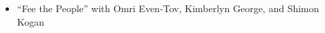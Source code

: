 
\vspace*{-.1in}

\begin{itemize}
\vspace*{-.07in}
    \item  ``Fee the People'' with Omri Even-Tov, Kimberlyn George, and Shimon Kogan
\end{itemize}




    



